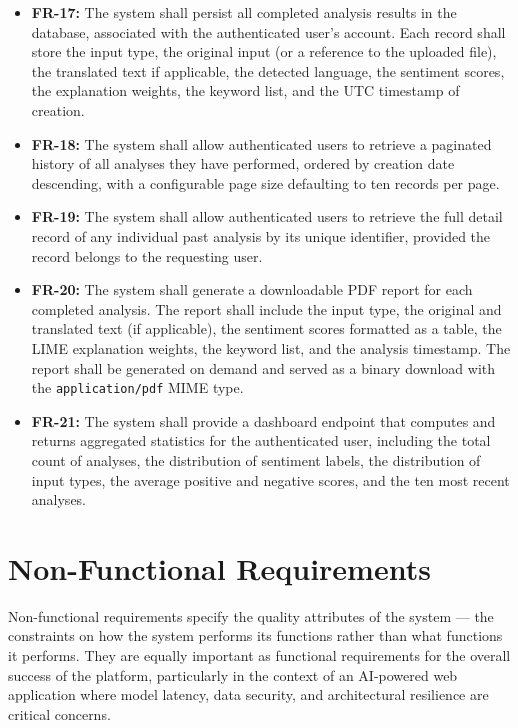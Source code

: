 \documentclass[12pt, a4paper]{report}
\begin{document}
\begin{itemize}[noitemsep, leftmargin=2em]
    \item \textbf{FR-17:} The system shall persist all completed analysis results in the database, associated with the authenticated user's account. Each record shall store the input type, the original input (or a reference to the uploaded file), the translated text if applicable, the detected language, the sentiment scores, the explanation weights, the keyword list, and the UTC timestamp of creation.
    \item \textbf{FR-18:} The system shall allow authenticated users to retrieve a paginated history of all analyses they have performed, ordered by creation date descending, with a configurable page size defaulting to ten records per page.
    \item \textbf{FR-19:} The system shall allow authenticated users to retrieve the full detail record of any individual past analysis by its unique identifier, provided the record belongs to the requesting user.
    \item \textbf{FR-20:} The system shall generate a downloadable PDF report for each completed analysis. The report shall include the input type, the original and translated text (if applicable), the sentiment scores formatted as a table, the LIME explanation weights, the keyword list, and the analysis timestamp. The report shall be generated on demand and served as a binary download with the \texttt{application/pdf} MIME type.
    \item \textbf{FR-21:} The system shall provide a dashboard endpoint that computes and returns aggregated statistics for the authenticated user, including the total count of analyses, the distribution of sentiment labels, the distribution of input types, the average positive and negative scores, and the ten most recent analyses.
\end{itemize}

\section{Non-Functional Requirements}

Non-functional requirements specify the quality attributes of the system --- the constraints on how the system performs its functions rather than what functions it performs. They are equally important as functional requirements for the overall success of the platform, particularly in the context of an AI-powered web application where model latency, data security, and architectural resilience are critical concerns.
\end{document}
